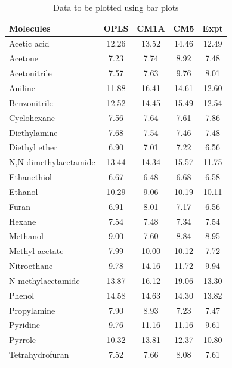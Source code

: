 \documentclass[oneside,11pt]{memoir} %
\begin{document}
\begin{table}
\caption{Data to be plotted using bar plots}
\begin{tiny}
\begin{tabular}{lcccc}
\toprule
             Molecules &  OPLS &  CM1A &  CM5 &  Expt \\
\midrule
          Acetic acid &      12.26 &      13.52 &     14.46 &      12.49 \\
              Acetone &       7.23 &       7.74 &      8.92 &       7.48 \\
         Acetonitrile &       7.57 &       7.63 &      9.76 &       8.01 \\
              Aniline &      11.88 &      16.41 &     14.61 &      12.60 \\
         Benzonitrile &      12.52 &      14.45 &     15.49 &      12.54 \\
          Cyclohexane &       7.56 &       7.64 &      7.61 &       7.86 \\
         Diethylamine &       7.68 &       7.54 &      7.46 &       7.48 \\
        Diethyl ether &       6.90 &       7.01 &      7.22 &       6.56 \\
N,N-dimethylacetamide &      13.44 &      14.34 &     15.57 &      11.75 \\
          Ethanethiol &       6.67 &       6.48 &      6.68 &       6.58 \\
              Ethanol &      10.29 &       9.06 &     10.19 &      10.11 \\
                Furan &       6.91 &       8.01 &      7.17 &       6.56 \\
               Hexane &       7.54 &       7.48 &      7.34 &       7.54 \\
             Methanol &       9.00 &       7.60 &      8.84 &       8.95 \\
       Methyl acetate &       7.99 &      10.00 &     10.12 &       7.72 \\
          Nitroethane &       9.78 &      14.16 &     11.72 &       9.94 \\
    N-methylacetamide &      13.87 &      16.12 &     19.06 &      13.30 \\
               Phenol &      14.58 &      14.63 &     14.30 &      13.82 \\
          Propylamine &       7.90 &       8.93 &      7.23 &       7.47 \\
             Pyridine &       9.76 &      11.16 &     11.16 &       9.61 \\
              Pyrrole &      10.32 &      13.81 &     12.37 &      10.80 \\
      Tetrahydrofuran &       7.52 &       7.66 &      8.08 &       7.61 \\
\bottomrule
\end{tabular}
\end{tiny}
\end{table}
\end{document}
